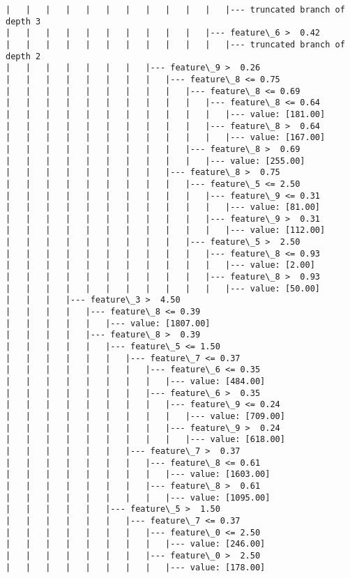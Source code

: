 \documentclass[11pt]{article}
\begin{document}
\begin{Verbatim}[commandchars=\\\{\}]
|   |   |   |   |   |   |   |   |   |   |   |--- truncated branch of depth 3
|   |   |   |   |   |   |   |   |   |   |--- feature\_6 >  0.42
|   |   |   |   |   |   |   |   |   |   |   |--- truncated branch of depth 2
|   |   |   |   |   |   |   |--- feature\_9 >  0.26
|   |   |   |   |   |   |   |   |--- feature\_8 <= 0.75
|   |   |   |   |   |   |   |   |   |--- feature\_8 <= 0.69
|   |   |   |   |   |   |   |   |   |   |--- feature\_8 <= 0.64
|   |   |   |   |   |   |   |   |   |   |   |--- value: [181.00]
|   |   |   |   |   |   |   |   |   |   |--- feature\_8 >  0.64
|   |   |   |   |   |   |   |   |   |   |   |--- value: [167.00]
|   |   |   |   |   |   |   |   |   |--- feature\_8 >  0.69
|   |   |   |   |   |   |   |   |   |   |--- value: [255.00]
|   |   |   |   |   |   |   |   |--- feature\_8 >  0.75
|   |   |   |   |   |   |   |   |   |--- feature\_5 <= 2.50
|   |   |   |   |   |   |   |   |   |   |--- feature\_9 <= 0.31
|   |   |   |   |   |   |   |   |   |   |   |--- value: [81.00]
|   |   |   |   |   |   |   |   |   |   |--- feature\_9 >  0.31
|   |   |   |   |   |   |   |   |   |   |   |--- value: [112.00]
|   |   |   |   |   |   |   |   |   |--- feature\_5 >  2.50
|   |   |   |   |   |   |   |   |   |   |--- feature\_8 <= 0.93
|   |   |   |   |   |   |   |   |   |   |   |--- value: [2.00]
|   |   |   |   |   |   |   |   |   |   |--- feature\_8 >  0.93
|   |   |   |   |   |   |   |   |   |   |   |--- value: [50.00]
|   |   |   |--- feature\_3 >  4.50
|   |   |   |   |--- feature\_8 <= 0.39
|   |   |   |   |   |--- value: [1807.00]
|   |   |   |   |--- feature\_8 >  0.39
|   |   |   |   |   |--- feature\_5 <= 1.50
|   |   |   |   |   |   |--- feature\_7 <= 0.37
|   |   |   |   |   |   |   |--- feature\_6 <= 0.35
|   |   |   |   |   |   |   |   |--- value: [484.00]
|   |   |   |   |   |   |   |--- feature\_6 >  0.35
|   |   |   |   |   |   |   |   |--- feature\_9 <= 0.24
|   |   |   |   |   |   |   |   |   |--- value: [709.00]
|   |   |   |   |   |   |   |   |--- feature\_9 >  0.24
|   |   |   |   |   |   |   |   |   |--- value: [618.00]
|   |   |   |   |   |   |--- feature\_7 >  0.37
|   |   |   |   |   |   |   |--- feature\_8 <= 0.61
|   |   |   |   |   |   |   |   |--- value: [1603.00]
|   |   |   |   |   |   |   |--- feature\_8 >  0.61
|   |   |   |   |   |   |   |   |--- value: [1095.00]
|   |   |   |   |   |--- feature\_5 >  1.50
|   |   |   |   |   |   |--- feature\_7 <= 0.37
|   |   |   |   |   |   |   |--- feature\_0 <= 2.50
|   |   |   |   |   |   |   |   |--- value: [246.00]
|   |   |   |   |   |   |   |--- feature\_0 >  2.50
|   |   |   |   |   |   |   |   |--- value: [178.00]

\end{Verbatim}
\end{document}
